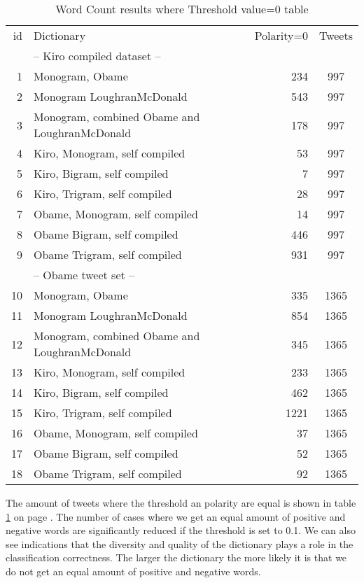 \begin{table}
\centering
\label{tbl:word_counting_polarity_null}
\caption{Word Count results where Threshold value=0 table}
\begin{tabular}{ r p{6cm} r c }
id & Dictionary & Polarity=0 & Tweets \\
& -- Kiro compiled dataset -- & & \\
\hline
1 & Monogram, Obame & 234 & 997 \\ 
2 & Monogram LoughranMcDonald & 543 & 997 \\ 
3 & Monogram, combined Obame and LoughranMcDonald & 178 & 997 \\
4 & Kiro, Monogram, self compiled & 53 & 997 \\
5 & Kiro, Bigram, self compiled & 7 & 997 \\
6 & Kiro, Trigram, self compiled & 28 & 997 \\
7 & Obame, Monogram, self compiled & 14 & 997 \\
8 & Obame Bigram, self compiled & 446 & 997 \\
9 & Obame Trigram, self compiled & 931 & 997 \\

& -- Obame tweet set -- & & \\
\hline
10 & Monogram, Obame & 335 & 1365 \\ 
11 & Monogram LoughranMcDonald & 854 & 1365 \\
12 & Monogram, combined Obame and LoughranMcDonald & 345 & 1365 \\
13 & Kiro, Monogram, self compiled & 233 & 1365 \\
14 & Kiro, Bigram, self compiled & 462 & 1365 \\
15 & Kiro, Trigram, self compiled & 1221 & 1365 \\
16 & Obame, Monogram, self compiled & 37 & 1365 \\
17 & Obame Bigram, self compiled & 52 & 1365 \\
18 & Obame Trigram, self compiled & 92 & 1365 \\
\end{tabular}
\end{table}

The amount of tweets where the threshold an polarity are equal is shown in table
\ref{tbl:word_counting_polarity_null} on page \pageref{tbl:word_counting_polarity_null}. The number of cases where we
get an equal amount of positive and negative words are significantly reduced if
the threshold is set to 0.1. We can also see indications that the diversity and
quality of the dictionary plays a role in the classification correctness. The
larger the dictionary the more likely it is that we do not get an equal
amount of positive and negative words.  
%

